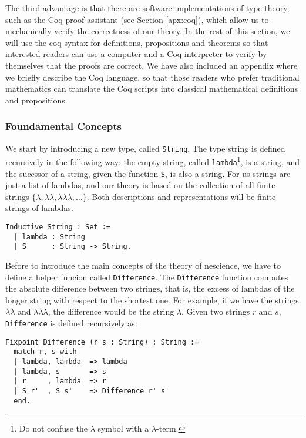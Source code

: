 The third advantage is that there are software implementations of type theory, such as the Coq proof assistant (see Section \ref{apx:coq}), which allow us to mechanically verify the correctness of our theory. In the rest of this section, we will use the coq syntax for definitions, propositions and theorems so that interested readers can use a computer and a Coq interpreter to verify by themselves that the proofs are correct. We have also included an appendix where we briefly describe the Coq language, so that those readers who prefer traditional mathematics can translate the Coq scripts into classical mathematical definitions and propositions.


\subsubsection*{Foundamental Concepts}

We start by introducing a new type, called \texttt{String}. The type string is defined recursively in the following way: the empty string, called \texttt{lambda}\footnote{Do not confuse the $\lambda$ symbol with a $\lambda$-term.}, is a string, and the sucessor of a string, given the function \texttt{S}, is also a string. For us strings are just a list of lambdas, and our theory is based on the collection of all finite strings $\{ \lambda, \lambda \lambda, \lambda \lambda \lambda, \ldots \}$. Both descriptions and representations will be finite strings of lambdas.

\begin{sourcecode}
{\scriptsize \begin{verbatim}
Inductive String : Set :=
  | lambda : String
  | S      : String -> String.
\end{verbatim}}
\end{sourcecode}

Before to introduce the main concepts of the theory of nescience, we have to define a helper funcion called \texttt{Difference}. The \texttt{Difference} function computes the absolute difference between two strings, that is, the excess of lambdas of the longer string with respect to the shortest one. For example, if we have the strings $\lambda \lambda$ and $\lambda \lambda \lambda$, the difference would be the string $\lambda$. Given two strings $r$ and $s$, \texttt{Difference} is defined recursively as:

\begin{sourcecode}
{\scriptsize \begin{verbatim}
Fixpoint Difference (r s : String) : String :=
  match r, s with
  | lambda, lambda  => lambda
  | lambda, s       => s
  | r     , lambda  => r
  | S r'  , S s'    => Difference r' s'
  end.
\end{verbatim}}
\end{sourcecode}

